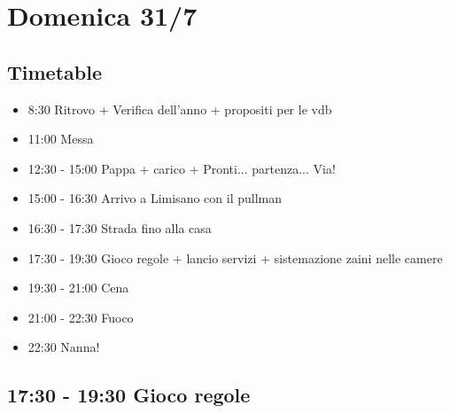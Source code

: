 \documentclass[../main.tex]{subfiles}
\begin{document}
    \section{Domenica 31/7}
    \subsection{Timetable}
    \begin{itemize}
        \item 8:30 Ritrovo + Verifica dell'anno + propositi per le vdb
        \item 11:00 Messa
        \item 12:30 - 15:00 Pappa + carico + Pronti... partenza... Via!
        \item 15:00 - 16:30 Arrivo a Limisano con il pullman
        \item 16:30 - 17:30 Strada fino alla casa
        \item 17:30 - 19:30 Gioco regole + lancio servizi + sistemazione zaini nelle camere
        \item 19:30 - 21:00 Cena
        \item 21:00 - 22:30 Fuoco
        \item 22:30 Nanna!
    \end{itemize}


    \subsection{17:30 - 19:30 Gioco regole}
\end{document}
